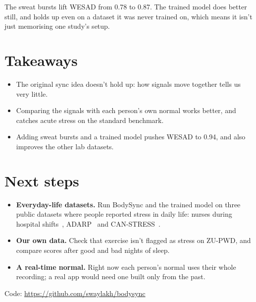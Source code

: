 \documentclass{article}
\begin{document}
The sweat bursts lift WESAD from 0.78 to 0.87. The trained model does better still, and holds up even on a dataset it was never trained on, which means it isn't just memorising one study's setup.

\section{Takeaways}

\begin{itemize}
\item The original sync idea doesn't hold up: how signals move together tells us very little.
\item Comparing the signals with each person's own normal works better, and catches acute stress on the standard benchmark.
\item Adding sweat bursts and a trained model pushes WESAD to 0.94, and also improves the other lab datasets.
\end{itemize}

\section{Next steps}

\begin{itemize}
\item \textbf{Everyday-life datasets.} Run BodySync and the trained model on three public datasets where people reported stress in daily life: nurses during hospital shifts~\cite{nurse}, ADARP~\cite{adarp} and CAN-STRESS~\cite{canstress}.
\item \textbf{Our own data.} Check that exercise isn't flagged as stress on ZU-PWD, and compare scores after good and bad nights of sleep.
\item \textbf{A real-time normal.} Right now each person's normal uses their whole recording; a real app would need one built only from the past.
\end{itemize}

Code: \url{https://github.com/swaylakh/bodysync}
\end{document}
